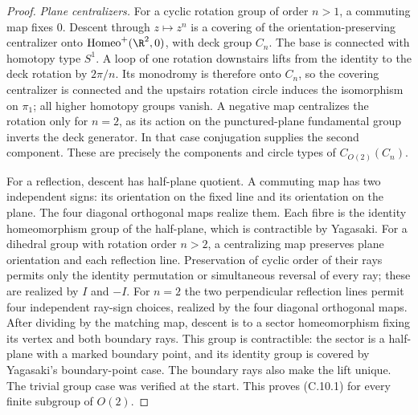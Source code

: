 \begin{proof}
\emph{Plane centralizers.}
For a cyclic rotation group of order $n>1$, a commuting map fixes $0$.
Descent through $z\mapsto z^n$ is a covering of the orientation-preserving
centralizer onto $\operatorname{Homeo}^+(\R^2,0)$, with deck group
$C_n$. The base is connected with homotopy type $S^1$. A loop of one
rotation downstairs lifts from the identity to the deck rotation by
$2\pi/n$. Its monodromy is therefore onto $C_n$, so the covering
centralizer is connected and the upstairs rotation circle induces the
isomorphism on $\pi_1$; all higher homotopy groups vanish. A negative
map centralizes the rotation only for $n=2$, as its action on the
punctured-plane fundamental group inverts the deck generator. In that
case conjugation supplies the second component. These are precisely
the components and circle types of $C_{O(2)}(C_n)$.

For a reflection, descent has half-plane quotient. A commuting map has
two independent signs: its orientation on the fixed line and its
orientation on the plane. The four diagonal orthogonal maps realize
them. Each fibre is the identity homeomorphism group of the half-plane,
which is contractible by Yagasaki. For a dihedral group with rotation
order $n>2$, a centralizing map preserves plane orientation and each
reflection line. Preservation of cyclic order of their rays permits
only the identity permutation or simultaneous reversal of every ray;
these are realized by $I$ and $-I$. For $n=2$ the two perpendicular
reflection lines permit four independent ray-sign choices, realized by
the four diagonal orthogonal maps. After dividing by the matching map,
descent is to a sector homeomorphism fixing its vertex and both boundary
rays. This group is contractible: the sector is a half-plane with a
marked boundary point, and its identity group is covered by Yagasaki's
boundary-point case. The boundary rays also make the lift unique.
The trivial group case was verified at the start. This proves (C.10.1)
for every finite subgroup of $O(2)$.


\end{proof}
